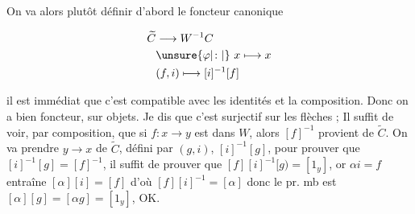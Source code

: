 On va alors plutôt définir d'abord le foncteur canonique

\[
\begin{aligned}
 \widetilde C&\longrightarrow W^{-1}C\\
 &\unsure{\varphi|\colon|{}}\ x\longmapsto x\\
 &(f,i)\longmapsto [i]^{-1}[f]
\end{aligned}
\]

il est immédiat que c'est compatible avec les identités et la composition. Donc on a bien foncteur,   sur objets. Je dis que c'est surjectif sur les flèches ; Il suffit de voir, par composition, que si $f:x\longrightarrow y$ est dans $W$, alors $[f]^{-1}$ provient de $\widetilde C$. On va prendre  $y\longrightarrow x$ de $\widetilde C$, défini par $(g,i)$,   $[i]^{-1}[g]$, pour prouver que $[i]^{-1}[g]=[f]^{-1}$, il suffit de prouver que $[f][i]^{-1}[g)=[1_y]$, or $\alpha i=f$ entraîne $[\alpha][i]=[f]$ d'où $[f][i]^{-1}=[\alpha]$ donc le pr. mb est $[\alpha][g]=[\alpha g]=[1_y]$, OK.
